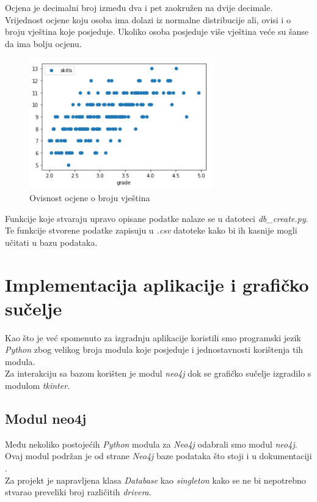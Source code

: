 \documentclass[titlepage, 12pt]{scrartcl}
\begin{document}
	Ocjena je decimalni broj između dva i pet zaokružen na dvije decimale. Vrijednost ocjene koju osoba ima dolazi iz normalne distribucije ali, ovisi i o broju vještina koje posjeduje. Ukoliko osoba posjeduje više vještina veće su šanse da ima bolju ocjenu.
	\begin{figure}[h]
		\centering
		\includegraphics{slike/Grades.png}
		\caption{Ovisnost ocjene o broju vještina}
		\label{fig:hobbies}
	\end{figure}
	
	Funkcije koje stvaraju upravo opisane podatke nalaze se u datoteci \emph{db\_create.py}. 
	Te funkcije stvorene podatke zapisuju u \emph{.csv} datoteke kako bi ih kasnije mogli učitati u bazu podataka.  
	\newpage
	
	\section{Implementacija aplikacije i grafičko sučelje}
	Kao što je već spomenuto za izgradnju aplikacije koristili smo programski jezik \emph{Python} zbog velikog broja modula koje posjeduje i jednostavnosti korištenja tih modula. \\
	Za interakciju sa bazom korišten je modul \emph{neo4j} dok se grafičko sučelje izgradilo s modulom \emph{tkinter}.
	\subsection{Modul neo4j}
	Među nekoliko postojećih \emph{Python} modula za \emph{Neo4j} odabrali smo modul \emph{neo4j}. Ovaj modul podržan je od strane \emph{Neo4j} baze podataka što stoji i u dokumentaciji \cite{neo4j-python}.\\
	Za projekt je napravljena klasa \emph{Database} kao \emph{singleton} kako se ne bi nepotrebno stvarao preveliki broj različitih \emph{drivera}.
	
\end{document}
